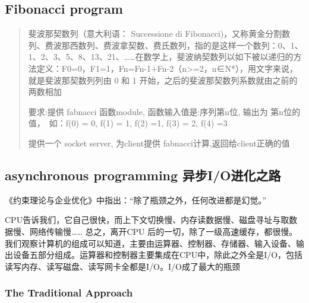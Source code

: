 \documentclass[11pt]{article}
\begin{document}
    \hypertarget{fibonacci-program}{%
\subsection{Fibonacci program}\label{fibonacci-program}}

    \begin{quote}
斐波那契数列（意大利语： Successione di
Fibonacci)，又称黄金分割数列、费波那西数列、费波拿契数、费氏数列，指的是这样一个数列：0、1、1、2、3、5、8、13、21、\ldots{}\ldots{}在数学上，斐波纳契数列以如下被以递归的方法定义：F0=0，F1=1，Fn=Fn-1+Fn-2（n\textgreater{}=2，n∈N*），用文字来说，就是斐波那契数列列由
0 和 1 开始，之后的斐波那契数列系数就由之前的两数相加

要求:提供 fabnacci 函数module, 函数输入值是:序列第n位, 输出为
第n位的值，　如：f(0) = 0, f(1) = 1, f(2) =1, f(3) = 2, f(4) =3

提供一个 socket server, 为client提供 fabnacci计算,返回给client正确的值
\end{quote}

    \hypertarget{asynchronous-programming-ux5f02ux6b65ioux8fdbux5316ux4e4bux8def}{%
\subsection{asynchronous programming
异步I/O进化之路}\label{asynchronous-programming-ux5f02ux6b65ioux8fdbux5316ux4e4bux8def}}

    《约束理论与企业优化》中指出：``除了瓶颈之外，任何改进都是幻觉。''

CPU告诉我们，它自己很快，而上下文切换慢、内存读数据慢、磁盘寻址与取数据慢、网络传输慢\ldots{}\ldots{}
总之，离开CPU
后的一切，除了一级高速缓存，都很慢。我们观察计算机的组成可以知道，主要由运算器、控制器、存储器、输入设备、输出设备五部分组成。运算器和控制器主要集成在CPU中，除此之外全是I/O，包括读写内存、读写磁盘、读写网卡全都是I/O。I/O成了最大的瓶颈

    \hypertarget{the-traditional-approach}{%
\subsubsection{The Traditional
Approach}\label{the-traditional-approach}}
\end{document}
